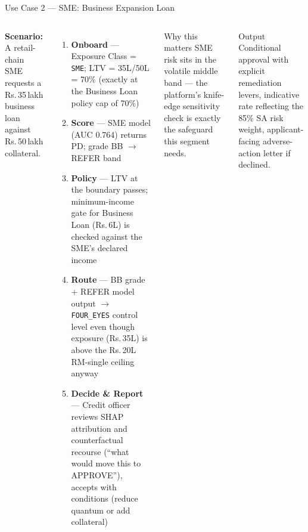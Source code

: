 \documentclass[9pt,aspectratio=169]{beamer}
\begin{document}
\begin{frame}{Use Case 2 --- SME: Business Expansion Loan}
\vspace{-2pt}
\begin{columns}[T]
    \footnotesize
    \textbf{Scenario:} A retail-chain SME requests a Rs.\,35\,lakh business loan against
    Rs.\,50\,lakh collateral.
    \begin{enumerate}\setlength\itemsep{4pt}
      \item[\textbf{1.}] \textbf{Onboard} --- Exposure Class = \texttt{SME}; LTV = 35L/50L = 70\%
            (exactly at the Business Loan policy cap of 70\%)
      \item[\textbf{2.}] \textbf{Score} --- SME model (AUC 0.764) returns PD; grade BB $\to$ REFER band
      \item[\textbf{3.}] \textbf{Policy} --- LTV at the boundary passes; minimum-income gate for
            Business Loan (Rs.\,6L) is checked against the SME's declared income
      \item[\textbf{4.}] \textbf{Route} --- BB grade + REFER model output $\to$ \texttt{FOUR\_EYES}
            control level even though exposure (Rs.\,35L) is above the Rs.\,20L RM-single ceiling anyway
      \item[\textbf{5.}] \textbf{Decide \& Report} --- Credit officer reviews SHAP attribution
            and counterfactual recourse (``what would move this to APPROVE''), accepts with
            conditions (reduce quantum or add collateral)
    \end{enumerate}
    \begin{block}{Why this matters}
      \footnotesize
      SME risk sits in the volatile middle band --- the platform's knife-edge sensitivity check
      is exactly the safeguard this segment needs.
    \end{block}
    \vspace{5pt}
    \begin{block}{Output}
      \footnotesize
      Conditional approval with explicit remediation levers, indicative rate reflecting the
      85\% SA risk weight, applicant-facing adverse-action letter if declined.
    \end{block}
\end{columns}
\end{frame}
\end{document}
